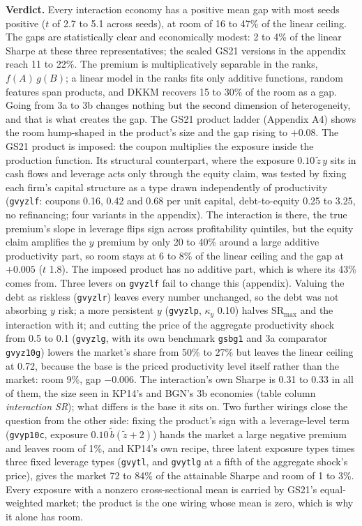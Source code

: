 \noindent\textbf{Verdict.} Every interaction economy has a positive mean gap with most seeds positive ($t$ of 2.7 to 5.1 across seeds), at room of 16 to 47\% of the linear ceiling. The gaps are statistically clear and economically modest: 2 to 4\% of the linear Sharpe at these three representatives; the scaled GS21 versions in the appendix reach 11 to 22\%. The premium is multiplicatively separable in the ranks, $f(A)\,g(B)$; a linear model in the ranks fits only additive functions, random features span products, and DKKM recovers 15 to 30\% of the room as a gap. Going from 3a to 3b changes nothing but the second dimension of heterogeneity, and that is what creates the gap. The GS21 product ladder (Appendix A4) shows the room hump-shaped in the product's size and the gap rising to $+0.08$. The GS21 product is imposed: the coupon multiplies the exposure inside the production function. Its structural counterpart, where the exposure $0.10\,\tilde z\,y$ sits in cash flows and leverage acts only through the equity claim, was tested by fixing each firm's capital structure as a type drawn independently of productivity (\texttt{gvyzlf}: coupons 0.16, 0.42 and 0.68 per unit capital, debt-to-equity 0.25 to 3.25, no refinancing; four variants in the appendix). The interaction is there, the true premium's slope in leverage flips sign across profitability quintiles, but the equity claim amplifies the $y$ premium by only 20 to 40\% around a large additive productivity part, so room stays at 6 to 8\% of the linear ceiling and the gap at $+0.005$ ($t$ 1.8). The imposed product has no additive part, which is where its 43\% comes from. Three levers on \texttt{gvyzlf} fail to change this (appendix). Valuing the debt as riskless (\texttt{gvyzlr}) leaves every number unchanged, so the debt was not absorbing $y$ risk; a more persistent $y$ (\texttt{gvyzlp}, $\kappa_y$ 0.10) halves $\mathrm{SR}_{\max}$ and the interaction with it; and cutting the price of the aggregate productivity shock from 0.5 to 0.1 (\texttt{gvyzlg}, with its own benchmark \texttt{gsbg1} and 3a comparator \texttt{gvyz10g}) lowers the market's share from 50\% to 27\% but leaves the linear ceiling at 0.72, because the base is the priced productivity level itself rather than the market: room 9\%, gap $-0.006$. The interaction's own Sharpe is 0.31 to 0.33 in all of them, the size seen in KP14's and BGN's 3b economies (table column \emph{interaction SR}); what differs is the base it sits on. Two further wirings close the question from the other side: fixing the product's sign with a leverage-level term (\texttt{gvyp10c}, exposure $0.10\,\tilde b(\tilde z+2)$) hands the market a large negative premium and leaves room of 1\%, and KP14's own recipe, three latent exposure types times three fixed leverage types (\texttt{gvytl}, and \texttt{gvytlg} at a fifth of the aggregate shock's price), gives the market 72 to 84\% of the attainable Sharpe and room of 1 to 3\%. Every exposure with a nonzero cross-sectional mean is carried by GS21's equal-weighted market; the product is the one wiring whose mean is zero, which is why it alone has room.


